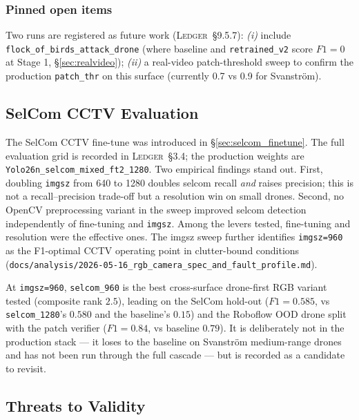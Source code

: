 \subsubsection{Pinned open items}
Two runs are registered as future work (\textsc{Ledger}~\S9.5.7): \emph{(i)} include \texttt{flock\_of\_birds\_attack\_drone} (where baseline and \texttt{retrained\_v2} score $F1=0$ at Stage 1, \S\ref{sec:realvideo}); \emph{(ii)} a real-video patch-threshold sweep to confirm the production \texttt{patch\_thr} on this surface (currently 0.7 vs 0.9 for Svanstr\"om).

\subsection{SelCom CCTV Evaluation}
\label{sec:selcom}

The SelCom CCTV fine-tune was introduced in \S\ref{sec:selcom_finetune}. The full evaluation grid is recorded in \textsc{Ledger}~\S3.4; the production weights are \texttt{Yolo26n\_selcom\_mixed\_ft2\_1280}. Two empirical findings stand out. First, doubling \texttt{imgsz} from 640 to 1280 doubles selcom recall \emph{and} raises precision; this is not a recall--precision trade-off but a resolution win on small drones. Second, no OpenCV preprocessing variant in the sweep improved selcom detection independently of fine-tuning and \texttt{imgsz}. Among the levers tested, fine-tuning and resolution were the effective ones. The imgsz sweep further identifies \texttt{imgsz=960} as the F1-optimal CCTV operating point in clutter-bound conditions (\texttt{docs/analysis/2026-05-16\_rgb\_camera\_spec\_and\_fault\_profile.md}).

At \texttt{imgsz=960}, \texttt{selcom\_960} is the best cross-surface drone-first RGB variant tested (composite rank $2.5$), leading on the SelCom hold-out ($F1=0.585$, vs \texttt{selcom\_1280}'s $0.580$ and the baseline's $0.15$) and the Roboflow OOD drone split with the patch verifier ($F1=0.84$, vs baseline $0.79$). It is deliberately not in the production stack --- it loses to the baseline on Svanstr\"om medium-range drones and has not been run through the full cascade --- but is recorded as a candidate to revisit.

\subsection{Threats to Validity}
\label{sec:threats}

